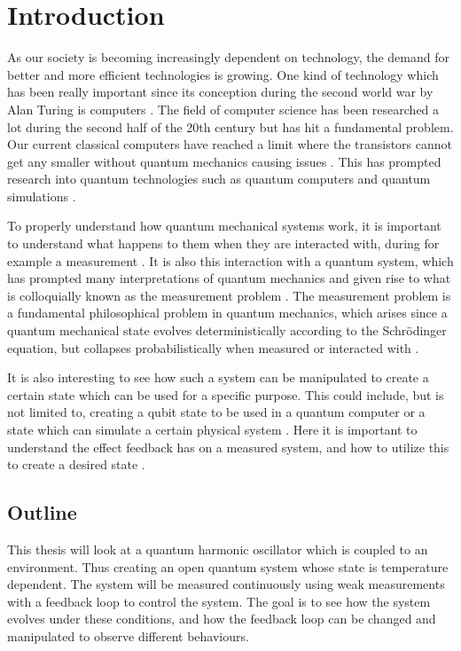 \section{Introduction}
As our society is becoming increasingly dependent on technology, the demand for better and more efficient technologies is growing. One kind of technology which has been really important since its conception during the second world war by Alan Turing is computers \cite{Nielsen:2010}. The field of computer science has been researched a lot during the second half of the 20th century but has hit a fundamental problem. Our current classical computers have reached a limit where the transistors cannot get any smaller without quantum mechanics causing issues \cite{Nielsen:2010}. This has prompted research into quantum technologies such as quantum computers and quantum simulations \cite{Nielsen:2010}. 

To properly understand how quantum mechanical systems work, it is important to understand what happens to them when they are interacted with, during for example a measurement \cite{Jordan:2024}. It is also this interaction with a quantum system, which has prompted many interpretations of quantum mechanics and given rise to what is colloquially known as the measurement problem \cite{Jordan:2024}. The measurement problem is a fundamental philosophical problem in quantum mechanics, which arises since a quantum mechanical state evolves deterministically according to the Schrödinger equation, but collapses probabilistically when measured or interacted with \cite{Jordan:2024}.

It is also interesting to see how such a system can be manipulated to create a certain state which can be used for a specific purpose. This could include, but is not limited to, creating a qubit state to be used in a quantum computer or a state which can simulate a certain physical system \cite{Nielsen:2010}. Here it is important to understand the effect feedback has on a measured system, and how to utilize this to create a desired state \cite{Annby-Andersson:2024}.

\subsection{Outline}
This thesis will look at a quantum harmonic oscillator which is coupled to an environment. Thus creating an open quantum system whose state is temperature dependent. The system will be measured continuously using weak measurements with a feedback loop to control the system. The goal is to see how the system evolves under these conditions, and how the feedback loop can be changed and manipulated to observe different behaviours.

\cite{Annby-Andersson:2024}

